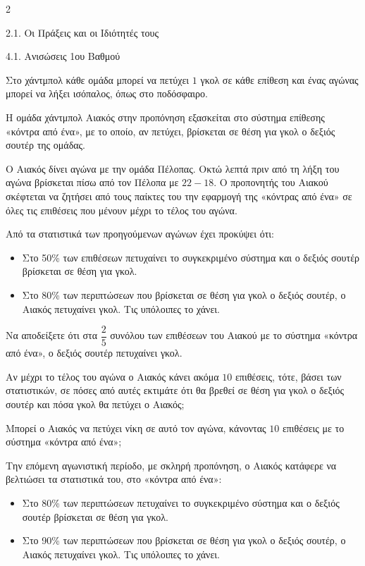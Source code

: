 \begin{ylh}{2}
    \item 2.1. Οι Πράξεις και οι Ιδιότητές τους
    \item 4.1. Ανισώσεις 1ου Βαθμού
\end{ylh}
Στο χάντμπολ κάθε ομάδα μπορεί να πετύχει $1$ γκολ σε κάθε επίθεση και ένας αγώνας μπορεί να λήξει ισόπαλος, όπως στο ποδόσφαιρο.

Η ομάδα χάντμπολ Αιακός στην προπόνηση εξασκείται στο σύστημα επίθεσης «κόντρα από ένα», με το οποίο, αν πετύχει, βρίσκεται σε θέση για γκολ ο δεξιός σουτέρ της ομάδας.

\begin{alist}
\item Ο Αιακός δίνει αγώνα με την ομάδα Πέλοπας. Οκτώ λεπτά πριν από τη λήξη του αγώνα βρίσκεται πίσω από τον Πέλοπα με $22-18$. Ο προπονητής του Αιακού σκέφτεται να ζητήσει από τους παίκτες του την εφαρμογή της «κόντρας από ένα» σε όλες τις επιθέσεις που μένουν μέχρι το τέλος του αγώνα.

Από τα στατιστικά των προηγούμενων αγώνων έχει προκύψει ότι:

\begin{itemize}
\item
  Στο 50\% των επιθέσεων πετυχαίνει το συγκεκριμένο σύστημα και ο δεξιός σουτέρ βρίσκεται σε θέση για γκολ.
\item
  Στο 80\% των περιπτώσεων που βρίσκεται σε θέση για γκολ ο δεξιός σουτέρ, ο Αιακός πετυχαίνει γκολ. Τις υπόλοιπες το χάνει.
\end{itemize}
\begin{rlist}
\item
  Να αποδείξετε ότι στα $\dfrac{2}{5}$ συνόλου των επιθέσεων του Αιακού με το σύστημα «κόντρα από ένα», ο δεξιός σουτέρ πετυχαίνει γκολ.
\item
  Αν μέχρι το τέλος του αγώνα ο Αιακός κάνει ακόμα $10$ επιθέσεις, τότε, βάσει των στατιστικών, σε πόσες από αυτές εκτιμάτε ότι θα βρεθεί σε θέση για γκολ ο δεξιός σουτέρ και πόσα γκολ θα πετύχει ο Αιακός;
\item
  Μπορεί ο Αιακός να πετύχει νίκη σε αυτό τον αγώνα, κάνοντας $10$ επιθέσεις με το σύστημα «κόντρα από ένα»;
\end{rlist}
\item Την επόμενη αγωνιστική περίοδο, με σκληρή προπόνηση, ο Αιακός κατάφερε να βελτιώσει τα στατιστικά του, στο «κόντρα από ένα»:
\begin{itemize}
\item
  Στο 80\% των περιπτώσεων πετυχαίνει το συγκεκριμένο σύστημα και ο δεξιός σουτέρ βρίσκεται σε θέση για γκολ.
\item
  Στο 90\% των περιπτώσεων που βρίσκεται σε θέση για γκολ ο δεξιός σουτέρ, ο Αιακός πετυχαίνει γκολ. Τις υπόλοιπες το χάνει.
\end{itemize}


\end{alist}

